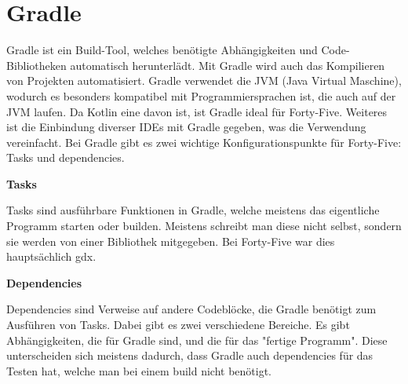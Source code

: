 
\renewcommand{\kapitelautor}{Autor: Felix Zwickelstorfer}
\section{Gradle}\label{sec:gradle}

\renewcommand{\kapitelautor}{Autor: Felix Zwickelstorfer}

Gradle ist ein Build-Tool, welches benötigte Abhängigkeiten und Code-Bibliotheken automatisch herunterlädt.
Mit Gradle wird auch das Kompilieren von Projekten automatisiert.
Gradle verwendet die JVM (Java Virtual Maschine), wodurch es besonders kompatibel mit Programmiersprachen ist, die auch auf der JVM laufen.
Da Kotlin eine davon ist, ist Gradle ideal für Forty-Five.
Weiteres ist die Einbindung diverser IDEs mit Gradle gegeben, was die Verwendung vereinfacht.
Bei Gradle gibt es zwei wichtige Konfigurationspunkte für Forty-Five: Tasks und dependencies.

\textbf{Tasks}

Tasks sind ausführbare Funktionen in Gradle, welche meistens das eigentliche Programm starten oder builden.
Meistens schreibt man diese nicht selbst, sondern sie werden von einer Bibliothek mitgegeben.
Bei Forty-Five war dies hauptsächlich gdx.

\textbf{Dependencies}

Dependencies sind Verweise auf andere Codeblöcke, die Gradle benötigt zum Ausführen von Tasks.
Dabei gibt es zwei verschiedene Bereiche.
Es gibt Abhängigkeiten, die für Gradle sind, und die für das "fertige Programm".
Diese unterscheiden sich meistens dadurch, dass Gradle auch dependencies für das Testen hat, welche man bei einem build nicht benötigt.\cite{gradleHomePage}


